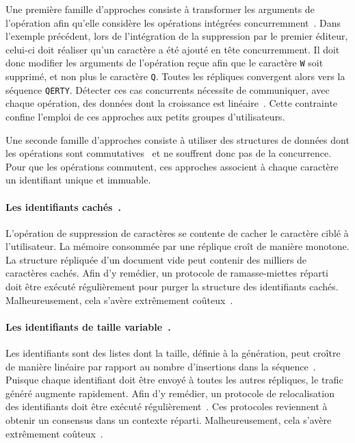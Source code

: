 Une première famille d'approches consiste à transformer les arguments de
l'opération afin qu'elle considère les opérations intégrées
concurremment~\cite{sun1998operational}. Dans l'exemple précédent, lors de
l'intégration de la suppression par le premier éditeur, celui-ci doit réaliser
qu'un caractère a été ajouté en tête concurremment. Il doit donc modifier les
arguments de l'opération reçue afin que le caractère \texttt{W} soit supprimé,
et non plus le caractère \texttt{Q}. Toutes les répliques convergent alors vers
la séquence \texttt{QERTY}.  Détecter ces cas concurrents nécessite de
communiquer, avec chaque opération, des données dont la croissance est
linéaire~\cite{charronbost1991concerning, sun2009contextbased}. Cette contrainte
confine l'emploi de ces approches aux petits groupes d'utilisateurs.

Une seconde famille d'approches consiste à utiliser des structures de données
dont les opérations sont commutatives~\cite{shapiro2011conflict} et ne souffrent
donc pas de la concurrence. Pour que les opérations commutent, ces approches
associent à chaque caractère un identifiant unique et immuable.

\paragraph{Les identifiants cachés~\cite{oster2006data}.} L'opération de
suppression de caractères se contente de cacher le caractère ciblé à
l'utilisateur. La mémoire consommée par une réplique croît de manière
monotone. %
La structure répliquée d'un document vide peut contenir des milliers de
caractères cachés.  Afin d'y remédier, un protocole de ramasse-miettes
réparti~\cite{abdullahi1998garbage} doit être exécuté régulièrement pour purger
la structure des identifiants cachés. Malheureusement, cela s'avère extrêmement
coûteux~\cite{abdullahi1998garbage}.

\paragraph{Les identifiants de taille variable~\cite{weiss2009logoot}.} Les
identifiants sont des listes dont la taille, définie à la génération, peut
croître de manière linéaire par rapport au nombre d'insertions dans la
séquence~\cite{weiss2009logoot}. %
Puisque chaque identifiant doit être envoyé à toutes les autres répliques, le
trafic généré augmente rapidement.  Afin d'y remédier, un protocole de
relocalisation des identifiants doit être exécuté
régulièrement~\cite{zawirskiasynchronous}. Ces protocoles reviennent à obtenir
un consensus dans un contexte réparti. Malheureusement, cela s'avère extrêmement
coûteux~\cite{mostefaoui2015signature}.

